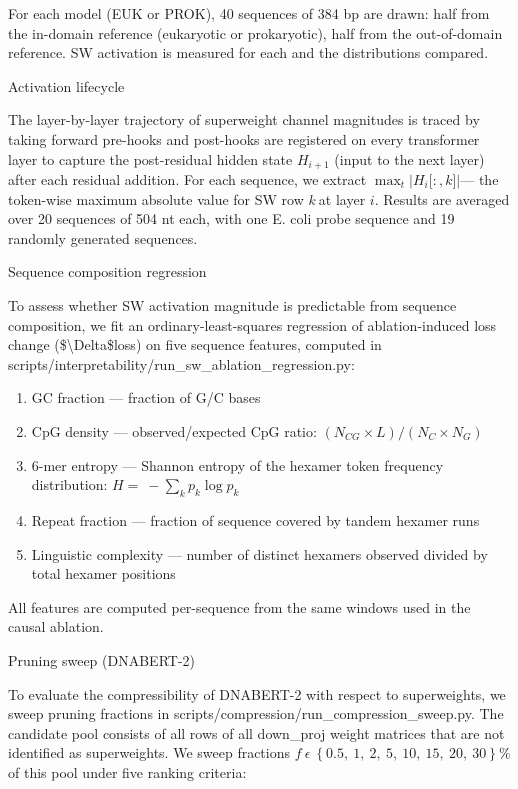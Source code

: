 \documentclass[11pt]{article}
\begin{document}
For each model (EUK or PROK), 40 sequences of 384 bp are drawn: half
from the in-domain reference (eukaryotic or prokaryotic), half from the
out-of-domain reference. SW activation is measured for each and the
distributions compared.

Activation lifecycle

The layer-by-layer trajectory of superweight channel magnitudes is
traced by taking forward pre-hooks and post-hooks are registered on
every transformer layer to capture the post-residual hidden state
\(H_{i + 1}\) (input to the next layer) after each residual addition.
For each sequence, we extract
\(\max_{t}\left| H_{i}\lbrack:,k\rbrack \right|\)--- the token-wise
maximum absolute value for SW row \(k\ \)at layer \(i\). Results are
averaged over 20 sequences of 504 nt each, with one E. coli probe
sequence and 19 randomly generated sequences.

Sequence composition regression

To assess whether SW activation magnitude is predictable from sequence
composition, we fit an ordinary-least-squares regression of
ablation-induced loss change (\$\textbackslash Delta\$loss) on five
sequence features, computed in
scripts/interpretability/run\_sw\_ablation\_regression.py:

\begin{enumerate}
\def\labelenumi{\arabic{enumi})}
\item
  GC fraction --- fraction of G/C bases
\item
  CpG density --- observed/expected CpG ratio:
  \((N_{CG} \times L)/(N_{C} \times N_{G})\)
\item
  6-mer entropy --- Shannon entropy of the hexamer token frequency
  distribution: \(H = \  - \sum_{k}^{}p_{k}\log p_{k}\)
\item
  Repeat fraction --- fraction of sequence covered by tandem hexamer
  runs
\item
  Linguistic complexity --- number of distinct hexamers observed divided
  by total hexamer positions
\end{enumerate}

All features are computed per-sequence from the same windows used in the
causal ablation.

Pruning sweep (DNABERT-2)

To evaluate the compressibility of DNABERT-2 with respect to
superweights, we sweep pruning fractions in
scripts/compression/run\_compression\_sweep.py. The candidate pool
consists of all rows of all down\_proj weight matrices that are not
identified as superweights. We sweep fractions
\(f\ \epsilon\ \left\{ 0.5,\ 1,\ 2,\ 5,\ 10,\ 15,\ 20,\ 30 \right\}\%\)
of this pool under five ranking criteria:
\end{document}
